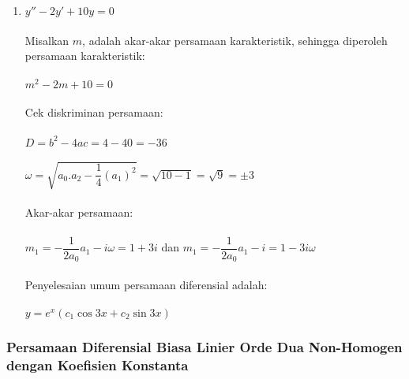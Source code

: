 \begin{enumerate}[1.]
	\item \begin{math} y'' - 2y' + 10y = 0 \end{math} \\ \\
	Misalkan \begin{math} m \end{math}, adalah akar-akar persamaan karakteristik, sehingga diperoleh persamaan karakteristik: \\ \\
	\begin{math} m^{2} - 2m + 10 = 0 \end{math} \\ \\
	Cek diskriminan persamaan: \\ \\
	\begin{math} D = b^{2} - 4ac = 4 - 40 = -36 \end{math} \\ \\
	\begin{math} \omega =  \sqrt{a_0 . a_2 - \dfrac{1}{4}(a_1)^{2}} = \sqrt{10 - 1} = \sqrt{9} = \pm 3 \end{math} \\ \\
	Akar-akar persamaan: \\ \\
	\begin{math} m_1 = -\dfrac{1}{2 a_0} a_1 - i \omega = 1 + 3i \end{math} dan \begin{math} m_1 = -\dfrac{1}{2 a_0} a_1 - i = 1 - 3i \omega \end{math} \\ \\
	Penyelesaian umum persamaan diferensial adalah: \\ \\
	\begin{math} y = e^{x} (c_1 \cos 3x + c_2 \sin 3x) \end{math}

\end{enumerate}

\subsubsection{Persamaan Diferensial Biasa Linier Orde Dua Non-Homogen dengan Koefisien Konstanta}
\label{parff:PDBLNHKK}

